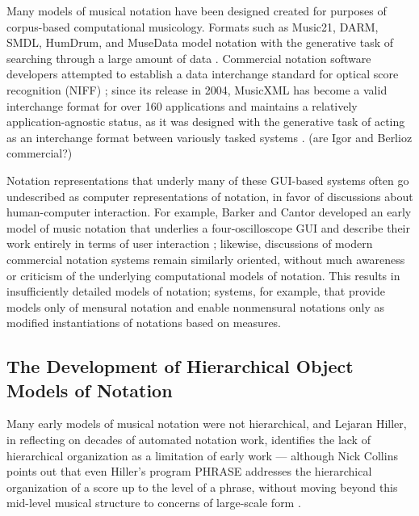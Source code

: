 Many models of musical notation have been designed created for purposes of corpus-based computational musicology. Formats such as Music21, DARM, SMDL, HumDrum, and MuseData model notation with the generative task of searching through a large amount of data \cite{Selfridge-Field:1997ud}. Commercial notation software developers attempted to establish a data interchange standard for optical score recognition (NIFF) \cite{niff1995niff}; since its release in 2004, MusicXML has become a valid interchange format for over 160 applications and maintains a relatively application-agnostic status, as it was designed with the generative task of acting as an interchange format between variously tasked systems \cite{Good:2001if}. (are Igor and Berlioz commercial?)

Notation representations that underly many of these GUI-based systems often go undescribed as computer representations of notation, in favor of discussions about human-computer interaction. For example, Barker and Cantor developed an early model of music notation that underlies a four-oscilloscope GUI and describe their work entirely in terms of user interaction \cite{cantor1971computer}; likewise, discussions of modern commercial notation systems remain similarly oriented, without much awareness or criticism of the underlying computational models of notation. This results in insufficiently detailed models of notation; systems, for example, that provide models only of mensural notation and enable nonmensural notations only as modified instantiations of notations based on measures.

\subsection{The Development of Hierarchical Object Models of Notation}
Many early models of musical notation were not hierarchical, and Lejaran Hiller, in reflecting on decades of automated notation work, identifies the lack of hierarchical organization as a limitation of early work --- although Nick Collins points out that even Hiller's program PHRASE addresses the hierarchical organization of a score up to the level of a phrase, without moving beyond this mid-level musical structure to concerns of large-scale form \cite[108]{Collins2009}. 

